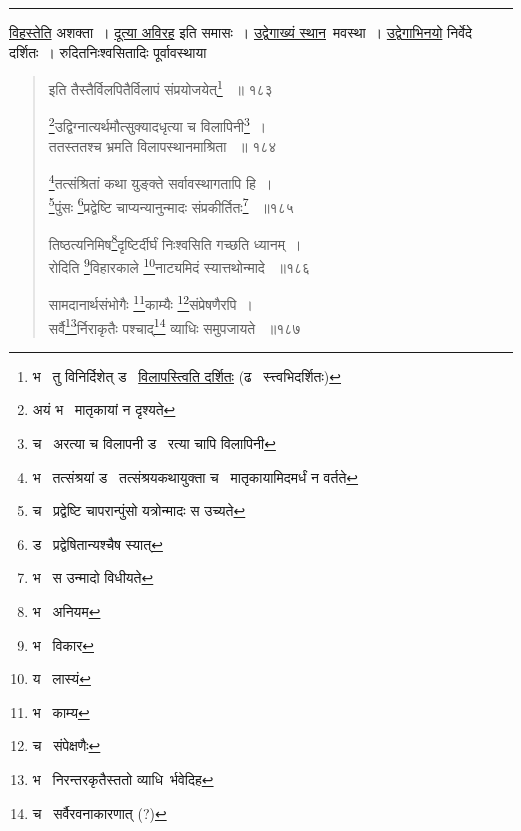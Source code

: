 \documentclass[11pt, openany]{book}
\begin{document}
\hrule

\vspace{2mm}

\begin{sloppypar}
\underline{विहस्तेति} अशक्ता~। \underline{दूत्या अविरह} इति समासः~। \underline{उद्वेगाख्यं स्थान}\textendash\ मवस्था~। \underline{उद्वेगाभिनयो} निर्वेदे दर्शितः~। रुदितनिःश्वसितादिः पूर्वावस्थाया 
\end{sloppypar}


\newpage

\lfoot{}

\begin{quote}
 {\na इति तैस्तैर्विलपितैर्विलापं संप्रयोजयेत्\renewcommand{\thefootnote}{1}\footnote{भ \textendash\ तु विनिर्दिशेत् ड \textendash\ \underline{विलापस्त्विति दर्शितः} (ढ \textendash\ स्त्त्वभिदर्शितः) } ~॥ १८३ 

\renewcommand{\thefootnote}{2}\footnote{अयं भ \textendash\ मातृकायां न दृश्यते}उद्विग्नात्यर्थमौत्सुक्यादधृत्या च विलापिनी\renewcommand{\thefootnote}{3}\footnote{च \textendash\ अरत्या च विलापनी ड \textendash\ रत्या चापि विलापिनी}~।\\ 
ततस्ततश्च भ्रमति विलापस्थानमाश्रिता ~॥ १८४ 

\renewcommand{\thefootnote}{4}\footnote{भ \textendash\ तत्संश्रयां ड \textendash\ तत्संश्रयकथायुक्ता च \textendash\ मातृकायामिदमर्धं न वर्तते }तत्संश्रितां कथा युङ्क्ते सर्वावस्थागतापि हि~। \\
\renewcommand{\thefootnote}{5}\footnote{च \textendash\ प्रद्वेष्टि चापरान्पुंसो यत्रोन्मादः स उच्यते}पुंसः \renewcommand{\thefootnote}{6}\footnote{ड \textendash\ प्रद्वेषितान्यश्चैष स्यात्}प्रद्वेष्टि चाप्यन्यानुन्मादः संप्रकीर्तितः\renewcommand{\thefootnote}{7}\footnote{भ \textendash\ स उन्मादो विधीयते } ~॥१८५ 

तिष्ठत्यनिमिष\renewcommand{\thefootnote}{8}\footnote{भ \textendash\ अनियम }दृष्टिर्दीर्घं निःश्वसिति गच्छति ध्यानम्~।\\
रोदिति \renewcommand{\thefootnote}{9}\footnote{भ \textendash\ विकार }विहारकाले \renewcommand{\thefootnote}{10}\footnote{य \textendash\ लास्यं}नाट्यमिदं स्यात्तथोन्मादे ~॥१८६

सामदानार्थसंभोगैः \renewcommand{\thefootnote}{11}\footnote{भ \textendash\ काम्य}काम्यैः \renewcommand{\thefootnote}{12}\footnote{च \textendash\ संपेक्षणैः}संप्रेषणैरपि~।\\ 
सर्वै\renewcommand{\thefootnote}{13}\footnote{भ \textendash\ निरन्तरकृतैस्ततो व्याधि\textendash\ र्भवेदिह }र्निराकृतैः पश्चाद्\renewcommand{\thefootnote}{14}\footnote{च \textendash\ सर्वैरवनाकारणात् (?) } व्याधिः समुपजायते ~॥१८७ }
\end{quote}
\end{document}
